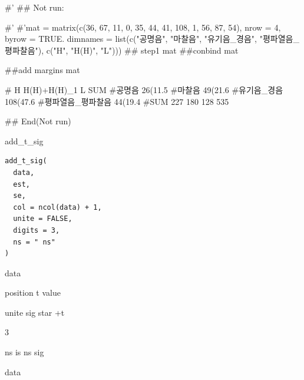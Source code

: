 \documentclass[a4paper]{book}
\begin{document}
\begin{Examples}
\begin{ExampleCode}

#'
## Not run: 

#' #'mat = matrix(c(36, 67, 11,
          0, 35, 44,
         41, 108, 1,
          56, 87, 54),
           nrow = 4, byrow = TRUE.
   dimnames = list(c("공명음", "마찰음",
     "유기음_경음", "평파열음_평파찰음"),  c("H", "H(H)", "L")))
## step1
  mat %
##conbind
 mat %

##add margins
 mat %

 #                           H H(H)+H(H)_1         L SUM
 #공명음             26(11.5%
 #마찰음             49(21.6%
 #유기음_경음       108(47.6%
 #평파열음_평파찰음  44(19.4%
 #SUM                      227         180       128 535







## End(Not run)

\end{ExampleCode}
\end{Examples}
%
\begin{Description}
add\_t\_sig
\end{Description}
%
\begin{Usage}
\begin{verbatim}
add_t_sig(
  data,
  est,
  se,
  col = ncol(data) + 1,
  unite = FALSE,
  digits = 3,
  ns = " ns"
)
\end{verbatim}
\end{Usage}
%
\begin{Arguments}
\begin{ldescription}
\item[\code{data}] data

\item[\code{col}] position t value

\item[\code{unite}] unite sig star +t

\item[\code{digits}] 3

\item[\code{ns}] ns is ns sig
\end{ldescription}
\end{Arguments}
%
\begin{Value}
data
\end{Value}
\end{document}

